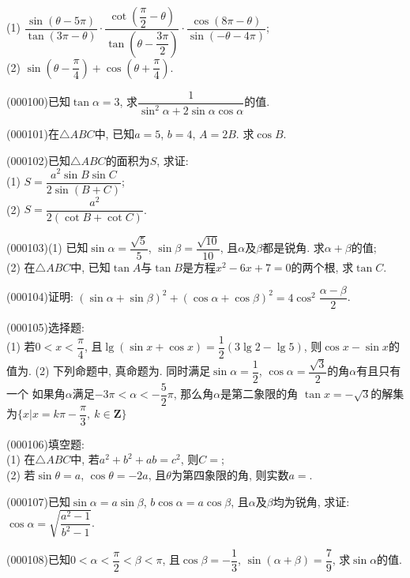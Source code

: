 (1) $\dfrac{\sin (\theta -5\pi )}{\tan (3\pi -\theta )}\cdot \dfrac{\cot (\dfrac\pi 2-\theta )}{\tan (\theta -\dfrac{3\pi} 2)}\cdot \dfrac{\cos (8\pi -\theta )}{\sin(-\theta-4\pi)}$;\\
(2) $\sin (\theta -\dfrac\pi 4)+\cos (\theta +\dfrac\pi 4)$.
\item (000100)已知$\tan \alpha=3$, 求$\dfrac 1{\sin^2\alpha+2\sin \alpha\cos \alpha}$的值.
\item (000101)在$\triangle ABC$中, 已知$a=5$, $b=4$, $A=2B$. 求$\cos B$.
\item (000102)已知$\triangle ABC$的面积为$S$, 求证:\\
(1) $S=\dfrac{a^2\sin B\sin C}{2\sin (B+C)}$;\\
(2) $S=\dfrac{a^2}{2(\cot B+\cot C)}$.
\item (000103)(1) 已知$\sin \alpha=\dfrac{\sqrt 5}5$, $\sin \beta=\dfrac{\sqrt {10}}{10}$, 且$\alpha$及$\beta$都是锐角. 求$\alpha+\beta$的值;\\
(2) 在$\triangle ABC$中, 已知$\tan A$与$\tan B$是方程$x^2-6x+7=0$的两个根, 求$\tan C$.
\item (000104)证明: $(\sin \alpha+\sin \beta)^2+(\cos \alpha+\cos \beta)^2=4\cos^2\dfrac{\alpha-\beta}{2}$.
\item (000105)选择题:\\
(1) 若$0<x<\dfrac\pi 4$, 且$\lg (\sin x+\cos x)=\dfrac12(3\lg 2-\lg 5)$, 则$\cos x-\sin x$的值为.
(2) 下列命题中, 真命题为.
{同时满足$\sin \alpha=\dfrac 12$, $\cos \alpha=\dfrac{\sqrt3}2$的角$\alpha$有且只有一个}
{如果角$\alpha$满足$-3\pi <\alpha<-\dfrac 52\pi$, 那么角$\alpha$是第二象限的角}
{$\tan x=-\sqrt 3$的解集为$\{x|x=k\pi -\dfrac\pi 3, \  k\in \mathbf{Z}\}$}
\item (000106)填空题:\\
(1) 在$\triangle ABC$中, 若$a^2+b^2+ab=c^2$, 则$C=$;\\
(2) 若$\sin \theta =a$, $\cos \theta =-2a$, 且$\theta$为第四象限的角, 则实数$a=$.\\
\item (000107)已知$\sin \alpha=a\sin \beta$, $b\cos \alpha=a\cos \beta$, 且$\alpha$及$\beta$均为锐角, 求证: $\cos \alpha= \sqrt{\dfrac{a^2-1}{b^2-1}}$.
\item (000108)已知$0<\alpha<\dfrac\pi 2<\beta<\pi$, 且$\cos \beta=-\dfrac13$, $\sin (\alpha+\beta)=\dfrac79$, 求$\sin \alpha$的值.
